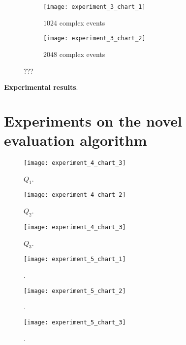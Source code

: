 \begin{figure}[H]
     \begin{adjustbox}{max width=1.2\linewidth,center}
     \centering
     \begin{subfigure}[b]{0.7\textwidth}
         \centering
         \texttt{[image: experiment\_3\_chart\_1]}
         \caption{$1024$ complex events}
         \label{fig:experiment:1:subfigure:1}
     \end{subfigure}
     \begin{subfigure}[b]{0.7\textwidth}
         \centering
         \texttt{[image: experiment\_3\_chart\_2]}
         \caption{$2048$ complex events}
         \label{fig:experiment:1:subfigure:2}
     \end{subfigure}
     \end{adjustbox}
     \caption{???}
     \label{fig:experiment:2}
\end{figure}

\textbf{Experimental results}.

\section{Experiments on the novel evaluation algorithm}\label{sec:new-algorithm}

\begin{figure}[H]
  \centering
  \texttt{[image: experiment\_4\_chart\_3]}
  \caption{$Q_{1}$.}
  \label{fig:???}
\end{figure}
\begin{figure}[H]
  \centering
  \texttt{[image: experiment\_4\_chart\_2]}
  \caption{$Q_{2}$.}
  \label{fig:???}
\end{figure}
\begin{figure}[H]
  \centering
  \texttt{[image: experiment\_4\_chart\_3]}
  \caption{$Q_{3}$.}
  \label{fig:???}
\end{figure}


\begin{figure}[H]
  \centering
  \texttt{[image: experiment\_5\_chart\_1]}
  \caption{.}
  \label{fig:???}
\end{figure}

\begin{figure}[H]
  \centering
  \texttt{[image: experiment\_5\_chart\_2]}
  \caption{.}
  \label{fig:???}
\end{figure}

\begin{figure}[H]
  \centering
  \texttt{[image: experiment\_5\_chart\_3]}
  \caption{.}
  \label{fig:???}
\end{figure}

